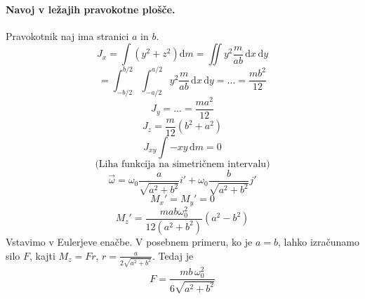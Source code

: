 \documentclass[a4paper]{article}
\newcommand{\vct}[1]{\overrightarrow{#1}}
\newcommand{\dif}{\mathrm{d}}
\begin{document}
\paragraph{Navoj v ležajih pravokotne plošče.} Pravokotnik naj ima stranici $a$ in $b$.
$$J_x = \int (y^2 + z^2)\dif m = \iint y^2 \frac{m}{ab}\,\dif x\,\dif y$$
$$=\int_{-b/2}^{b/2}\int_{-a/2}^{a/2} y^2 \frac{m}{ab}\,\dif x\,\dif y = ... = \frac{mb^2}{12}$$
$$J_y = ... = \frac{ma^2}{12}$$
$$J_z = \frac{m}{12}(b^2 + a^2)$$
$$J_{xy} \int -xy\,\dif m = 0$$
$$\text{(Liha funkcija na simetričnem intervalu)}$$
$$\vct{\omega} = \omega_0 \frac{a}{\sqrt{a^2 + b^2}}i' + \omega_0\frac{b}{\sqrt{a^2 + b^2}}j'$$
$$M_x' = M_y' = 0$$
$$M_z' = \frac{mab\omega_0^2}{12(a^2 + b^2)}(a^2 - b^2)$$
Vstavimo v Eulerjeve enačbe.
V posebnem primeru, ko je $a=b$, lahko izračunamo silo $F$, kajti $M_z = Fr$, $\displaystyle{r = \frac{a}{2\sqrt{a^2+b^2}}}$.
Tedaj je $$F = \frac{mb\,\omega_0^2}{6\sqrt{a^2 + b^2}}$$
\end{document}
